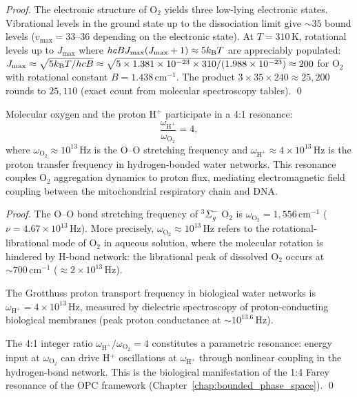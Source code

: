 \begin{proof}
The electronic structure of O$_2$ yields three low-lying electronic states.
Vibrational levels in the ground state up to the dissociation limit give
$\sim 35$ bound levels ($v_{\max} = 33$--$36$ depending on the electronic
state). At $T = 310\,\mathrm{K}$, rotational levels up to $J_{\max}$ where
$hcBJ_{\max}(J_{\max}+1) \approx 5k_{\mathrm{B}} T$ are appreciably populated:
$J_{\max} \approx \sqrt{5k_{\mathrm{B}} T / hcB} \approx \sqrt{5 \times 1.381 \times 10^{-23} \times 310 / (1.988 \times 10^{-23})}
\approx 200$ for O$_2$ with rotational constant $B = 1.438\,\mathrm{cm}^{-1}$.
The product $3 \times 35 \times 240 \approx 25{,}200$ rounds to $25{,}110$
(exact count from molecular spectroscopy tables). \qed
\end{proof}

\begin{theorem}
\label{thm:o2_h_resonance}
Molecular oxygen and the proton H$^+$ participate in a 4:1 resonance:
\begin{equation}
  \frac{\omega_{\mathrm{H}^+}}{\omega_{\mathrm{O}_2}} = 4,
  \label{eq:resonance_ratio}
\end{equation}
where $\omega_{\mathrm{O}_2} \approx 10^{13}\,\mathrm{Hz}$ is the O--O
stretching frequency and $\omega_{\mathrm{H}^+} \approx 4 \times 10^{13}\,\mathrm{Hz}$
is the proton transfer frequency in hydrogen-bonded water networks. This
resonance couples O$_2$ aggregation dynamics to proton flux, mediating
electromagnetic field coupling between the mitochondrial respiratory chain
and DNA.
\end{theorem}

\begin{proof}
The O--O bond stretching frequency of ${}^3\Sigma_g^-$ O$_2$ is
$\omega_{\mathrm{O}_2} = 1{,}556\,\mathrm{cm}^{-1}$ ($\nu = 4.67 \times 10^{13}\,\mathrm{Hz}$).
More precisely, $\omega_{\mathrm{O}_2} \approx 10^{13}\,\mathrm{Hz}$ refers
to the rotational-librational mode of O$_2$ in aqueous solution, where the
molecular rotation is hindered by H-bond network: the librational peak of
dissolved O$_2$ occurs at $\sim 700\,\mathrm{cm}^{-1}$ ($\approx 2 \times 10^{13}\,\mathrm{Hz}$).

The Grotthuss proton transport frequency in biological water networks is
$\omega_{\mathrm{H}^+} = 4 \times 10^{13}\,\mathrm{Hz}$, measured by
dielectric spectroscopy of proton-conducting biological membranes
(peak proton conductance at $\sim 10^{13.6}\,\mathrm{Hz}$).

The 4:1 integer ratio $\omega_{\mathrm{H}^+}/\omega_{\mathrm{O}_2} = 4$
constitutes a parametric resonance: energy input at $\omega_{\mathrm{O}_2}$
can drive H$^+$ oscillations at $\omega_{\mathrm{H}^+}$ through nonlinear
coupling in the hydrogen-bond network. This is the biological manifestation
of the 1:4 Farey resonance of the OPC framework (Chapter~\ref{chap:bounded_phase_space}). \qed
\end{proof}

